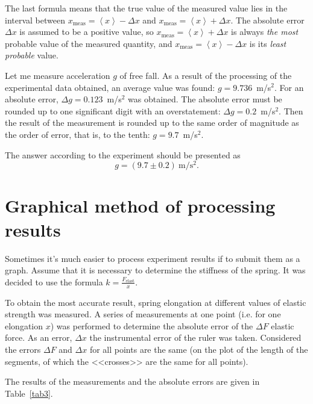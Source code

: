 \documentclass{LabWorkEng}
\begin{document}
The last formula means that the true value of the measured value lies in the interval between $x_\mathrm{meas} = \left\langle x \right\rangle  - \Delta x$ and $x_\mathrm{meas} = \left\langle x \right\rangle  + \Delta x$. The absolute error $\Delta x$ is assumed to be a positive value, so $x_\mathrm{meas} = \left\langle x \right\rangle  + \Delta x$ is always \textit{the most} probable value of the measured quantity, and $x_\mathrm{meas} = \left\langle x \right\rangle  - \Delta x$  is its \textit{least probable} value.

\noindent%
\begin{Example}
	Let me measure acceleration $g$ of free fall. As a result of the processing of the experimental data obtained, an average value was found: $g = 9.736$~m/s$^2$. For an absolute error, $\Delta g = 0.123$~m/s$^2$ was obtained. The absolute error must be rounded up to one significant digit with an overstatement: $\Delta g = 0.2$~m/s$^2$. Then the result of the measurement is rounded up to the same order of magnitude as the order of error, that is, to the tenth: $g = 9.7$~m/s$^2$.
	
	The answer according to the experiment should be presented as \[g = (9.7 \pm 0.2)~\text{m/s$^2$}.\]
\end{Example}

\section{Graphical method of processing results}

Sometimes it's much easier to process experiment results if to submit them as a graph. Assume that it is necessary to determine the stiffness of the spring. It was decided to use the formula $k = \frac{F_\mathrm{elast}}{x}$.

To obtain the most accurate result, spring elongation at different values of elastic strength was measured. A series of measurements at one point (i.e. for one elongation $x$) was performed to determine the absolute error of the $\Delta F$ elastic force. As an error, $\Delta x$ the instrumental error of the ruler was taken. Considered the errors $\Delta F$ and $\Delta x$ for all points are the same (on the plot of the length of the segments, of which the <<crosses>> are the same for all points).

The results of the measurements and the absolute errors are given in Table~\ref{tab3}.
\end{document}
